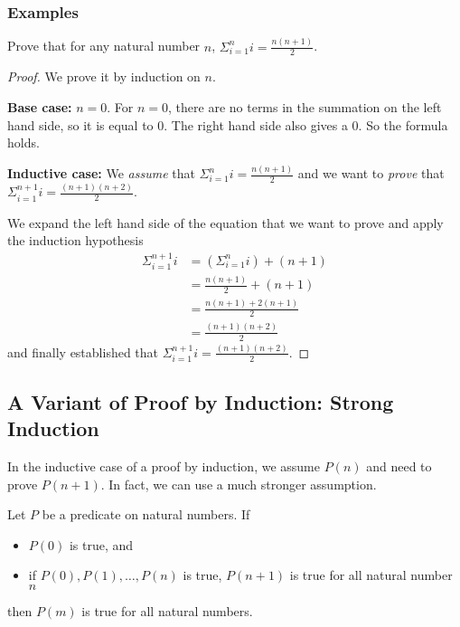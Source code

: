 \documentclass[11pt]{article}
\begin{document}
\subsubsection{Examples}

Prove that for any natural number $n$, $\Sigma_{i=1}^n i = \frac{n(n+1)}{2}$.

\begin{proof}
We prove it by induction on $n$.

\textbf{Base case:} $n = 0$. For $n = 0$, there are no terms in the summation on the left
hand side, so it is equal to $0$. The right hand side also gives a $0$. So the formula
holds.

\textbf{Inductive case:} We \emph{assume} that $\Sigma_{i=1}^n i = \frac{n(n+1)}{2}$ and we
want to \emph{prove} that $\Sigma_{i=1}^{n+1} i = \frac{(n+1)(n+2)}{2}$.

We expand the left hand side of the equation that we want to prove and apply the induction
hypothesis
\begin{align*}
\Sigma_{i=1}^{n+1} i &= (\Sigma_{i=1}^n i) + (n+1) \\
&= \frac{n(n+1)}{2} + (n+1) \\
&= \frac{n(n+1)+2(n+1)}{2} \\
&= \frac{(n+1)(n+2)}{2}
\end{align*}
and finally established that $\Sigma_{i=1}^{n+1} i = \frac{(n+1)(n+2)}{2}$.

\end{proof}

\subsection{A Variant of Proof by Induction: Strong Induction}

In the inductive case of a proof by induction, we assume $P(n)$ and need to prove $P(n+1)$.
In fact, we can use a much stronger assumption.

\begin{theorem}
Let $P$ be a predicate on natural numbers. If
\begin{itemize}
\item $P(0)$ is true, and
\item if $P(0), P(1), \dots, P(n)$ is true, $P(n+1)$ is true for all natural number $n$
\end{itemize}
then $P(m)$ is true for all natural numbers.
\end{theorem}
\end{document}
